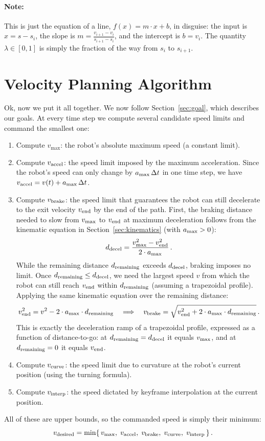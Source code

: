 \documentclass[11pt]{article}
\begin{document}
\paragraph{Note:} This is just the equation of a line, \(f(x) = m \cdot x + b\), in disguise: the input is \(x = s - s_i\), the slope is \(m = \frac{v_{i+1} - v_i}{s_{i+1} - s_i}\), and the intercept is \(b = v_i\). The quantity \(\lambda \in [0,1]\) is simply the fraction of the way from \(s_i\) to \(s_{i+1}\).

\section{Velocity Planning Algorithm}

Ok, now we put it all together. We now follow Section~\ref{sec:goal}, which describes our goals. At every time step we compute several candidate speed limits and command the smallest one:

\begin{enumerate}
  \item Compute \(v_{\max}\): the robot’s absolute maximum speed (a constant limit).

  \item Compute \(v_{\rm accel}\): the speed limit imposed by the maximum acceleration. Since the robot's speed can only change by \(a_{\rm max}\,\Delta t\) in one time step, we have
  \(v_{\rm accel} = v(t) + a_{\rm max}\,\Delta t\).

  \item Compute \(v_{\rm brake}\): the speed limit that guarantees the robot can still decelerate to the exit velocity \(v_{\rm end}\) by the end of the path. First, the braking distance needed to slow from \(v_{\rm max}\) to \(v_{\rm end}\) at maximum deceleration follows from the kinematic equation in Section~\ref{sec:kinematics} (with \(a_{\rm max} > 0\)):
\[
	d_{\rm decel} = \frac{v_{\rm max}^2 - v_{\rm end}^2}{2 \cdot a_{\rm max}}\,.
\]
While the remaining distance \(d_{\rm remaining}\) exceeds \(d_{\rm decel}\), braking imposes no limit. Once \(d_{\rm remaining} \le d_{\rm decel}\), we need the largest speed \(v\) from which the robot can still reach \(v_{\rm end}\) within \(d_{\rm remaining}\) (assuming a trapezoidal profile). Applying the same kinematic equation over the remaining distance:
\[
v_{\rm end}^2 = v^2 - 2 \cdot a_{\rm max} \cdot d_{\rm remaining}
\quad\Longrightarrow\quad
v_{\rm brake} = \sqrt{v_{\rm end}^2 + 2 \cdot a_{\rm max} \cdot d_{\rm remaining}}\,.
\]
This is exactly the deceleration ramp of a trapezoidal profile, expressed as a function of distance-to-go: at \(d_{\rm remaining} = d_{\rm decel}\) it equals \(v_{\rm max}\), and at \(d_{\rm remaining} = 0\) it equals \(v_{\rm end}\).
  \item Compute \(v_{\rm curve}\): the speed limit due to curvature at the robot’s current position (using the turning formula).
  \item Compute \(v_{\rm interp}\): the speed dictated by keyframe interpolation at the current position.
\end{enumerate}
All of these are upper bounds, so the commanded speed is simply their minimum:
\[
v_{\rm desired} = \min\{\,v_{\max},\;v_{\rm accel},\;v_{\rm brake},\;v_{\rm curve},\;v_{\rm interp}\,\}\,.
\]
\end{document}
